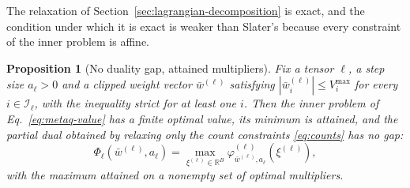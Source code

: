 \documentclass{article}
\newtheorem{proposition}{Proposition}
\begin{document}
The relaxation of Section~\ref{sec:lagrangian-decomposition} is exact, and the
condition under which it is exact is weaker than Slater's because every
constraint of the inner problem is affine.

\begin{proposition}[No duality gap, attained multipliers]
\label{prop:strong-duality}
Fix a tensor $\ell$, a step size $a_\ell>0$ and a clipped weight vector
$\bar w^{(\ell)}$ satisfying $|\bar w_i^{(\ell)}|\leq V_i^{\max}$ for every
$i\in\mathcal I_\ell$, with the inequality strict for at least one $i$. Then the inner problem of
Eq.~\eqref{eq:metaq-value} has a finite optimal value, its minimum is attained,
and the partial dual obtained by relaxing only the count constraints
\eqref{eq:counts} has no gap:
\[
  \Phi_\ell(\bar w^{(\ell)},a_\ell)
  =\max_{\xi^{(\ell)}\in\mathbb R^{B}}
   \varphi^{(\ell)}_{\bar w^{(\ell)},a_\ell}(\xi^{(\ell)}),
\]
with the maximum attained on a nonempty set of optimal multipliers.
\end{proposition}
\end{document}
